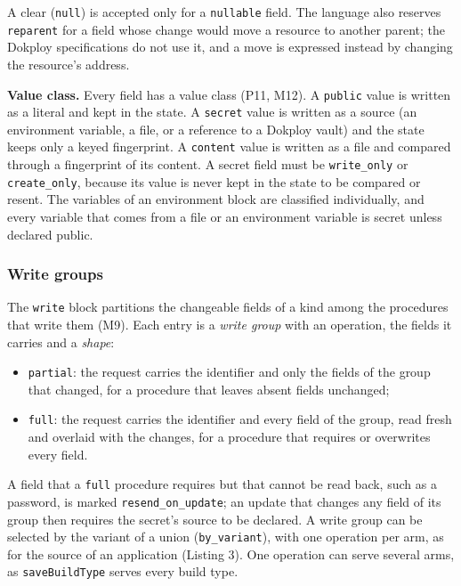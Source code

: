 A clear (\texttt{null}) is accepted only for a \texttt{nullable} field. The language also reserves \texttt{reparent} for a
field whose change would move a resource to another parent; the Dokploy specifications do not use
it, and a move is expressed instead by changing the resource's address.

\textbf{Value class.} Every field has a value class (P11, M12). A \texttt{public} value is written as a literal
and kept in the state. A \texttt{secret} value is written as a source (an environment variable, a file, or a
reference to a Dokploy vault) and the state keeps only a keyed fingerprint. A \texttt{content} value is
written as a file and compared through a fingerprint of its content. A secret field must be
\texttt{write\_only} or \texttt{create\_only}, because its value is never kept in the state to be compared or resent. The variables of an
environment block are classified individually, and every variable that comes from a file or an
environment variable is secret unless declared public.

\subsubsection*{Write groups}

The \texttt{write} block partitions the changeable fields of a kind among the procedures that write them
(M9). Each entry is a \emph{write group} with an operation, the fields it carries and a \emph{shape}:

\begin{itemize}
\item
  \texttt{partial}: the request carries the identifier and only the fields of the group that changed, for a
  procedure that leaves absent fields unchanged;
\item
  \texttt{full}: the request carries the identifier and every field of the group, read fresh and overlaid
  with the changes, for a procedure that requires or overwrites every field.
\end{itemize}

A field that a \texttt{full} procedure requires but that cannot be read back, such as a password, is marked
\texttt{resend\_on\_update}; an update that changes any field of its group then requires the secret's source
to be declared. A write group can be selected by the variant of a union (\texttt{by\_variant}), with one
operation per arm, as for the source of an application (Listing 3). One operation can serve several
arms, as \texttt{saveBuildType} serves every build type.


